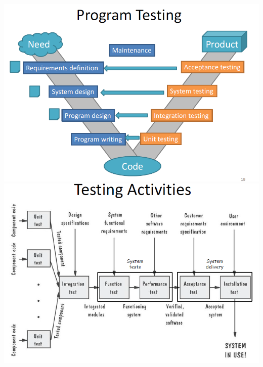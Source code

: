 \documentclass{article}
\begin{document}
\begin{center}
    \includegraphics[scale=0.4]{image/53.PNG}
    \includegraphics[scale=0.4]{image/54.PNG}
\end{center}
\end{document}
